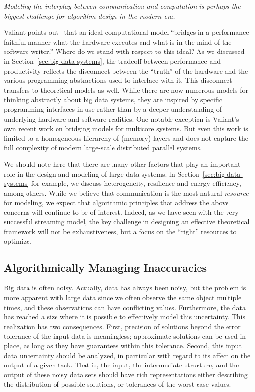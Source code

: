 \documentclass{article}
\begin{document}
\begin{center}
\emph{Modeling the interplay between communication and computation is perhaps the biggest challenge for algorithm design in the modern era. }
\end{center}


Valiant points out~\cite{Bridging} that an ideal computational model ``bridges in a performance-faithful manner what the hardware executes and what is in the mind of the software writer.''   Where do we stand with respect to this ideal?   
As we discussed in Section~\ref{sec:big-data-systems}, the tradeoff between performance
and productivity reflects the disconnect between the ``truth'' of the hardware and the various programming abstractions used to interface with it. 
This disconnect transfers to theoretical models as well. While there are now numerous models for thinking abstractly about big data systems, they are inspired by specific programming interfaces in use rather than by a deeper understanding of underlying hardware and software realities. 
One notable exception is Valiant's own recent work on bridging models for multicore systems. But even this work is limited to a homogeneous hierarchy of (memory) layers and does not capture the full complexity of modern large-scale distributed parallel systems. 

We should note here that there are many other factors that play an important role in the design and modeling of large-data systems. In Section~\ref{sec:big-data-systems} for example, we discuss heterogeneity, resilience and energy-efficiency, among others. While we believe that communication is the most natural \emph{resource} for modeling, we expect that algorithmic principles that address the above concerns will continue to be of interest. 
Indeed, as we have seen with the very successful streaming model, the key challenge in designing an effective theoretical framework will not be exhaustiveness, but a focus on the ``right'' resources to optimize. 


\subsection*{Algorithmically Managing Inaccuracies}

Big data is often noisy.  Actually, data has always been noisy, but the problem is more apparent with large data since we often observe the same object multiple times, and these observations can have conflicting values.  Furthermore, the data has reached a size where it is possible to effectively model this uncertainty.  This realization has two consequences.  First, precision of solutions beyond the error tolerance of the input data is meaningless; approximate solutions can be used in place, as long as they have guarantees within this tolerance.  
Second, this input data uncertainty should be analyzed, in particular with regard to its affect on the output of a given task.  
That is, the input, the intermediate structure, and the output of these noisy data sets should have rich representations either describing the distribution of possible solutions, or tolerances of the worst case values.  
\end{document}
